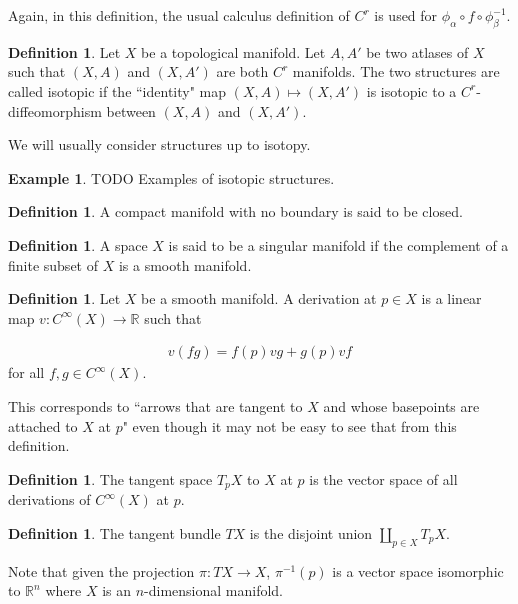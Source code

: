 \documentclass[11pt, psamsfonts]{amsart}
\theoremstyle{definition}
\newtheorem{defn}[thm]{Definition}
\newtheorem{exmp}[thm]{Example}
\theoremstyle{remark}
\numberwithin{equation}{section}
\begin{document}
Again, in this definition, the usual calculus definition of $C^r$ is used for $\phi_{\alpha} \circ f \circ \phi_{\beta}^{-1}$.

\begin{defn}
  Let $X$ be a topological manifold.
  Let $A, A'$ be two atlases of $X$ such that $(X, A)$ and $(X, A')$ are both $C^r$ manifolds.
  The two structures are called isotopic if the ``identity" map $(X, A) \mapsto (X, A')$ is isotopic to a $C^r$-diffeomorphism between $(X, A)$ and $(X, A')$.
\end{defn}

We will usually consider structures up to isotopy.

\begin{exmp}
  TODO
  Examples of isotopic structures.
\end{exmp}

\begin{defn}
  A compact manifold with no boundary is said to be closed.
\end{defn}

\begin{defn}
  A space $X$ is said to be a singular manifold if the complement of a finite subset of $X$ is a smooth manifold.
\end{defn}


\begin{defn}
  Let $X$ be a smooth manifold.
  A derivation at $p \in X$ is a linear map $v: C^{\infty}(X) \rightarrow \mathbb{R}$ such that

  \begin{align*}
    v(fg) = f(p)vg + g(p)vf
  \end{align*}
  for all $f, g \in C^{\infty}(X)$.

  This corresponds to ``arrows that are tangent to $X$ and whose basepoints are attached to $X$ at $p$" even though it may not be easy to see that from this definition.
\end{defn}

\begin{defn}
  The tangent space $T_pX$ to $X$ at $p$ is the vector space of all derivations of $C^{\infty}(X)$ at $p$.
\end{defn}


\begin{defn}
  The tangent bundle $TX$ is the disjoint union $\coprod_{p \in X} T_pX$.
\end{defn}

Note that given the projection $\pi: TX \rightarrow X$, $\pi^{-1}(p)$ is a vector space isomorphic to $\mathbb{R}^n$ where $X$ is an $n$-dimensional manifold.
\end{document}
